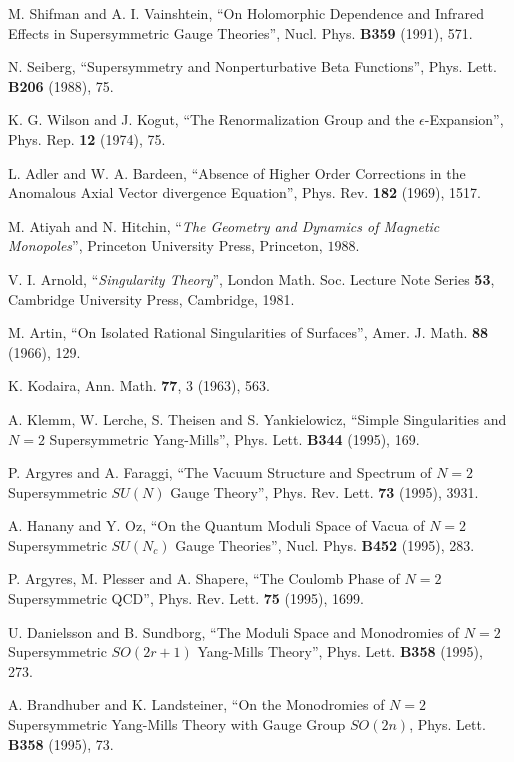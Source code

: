 \begin{thebibliography}{99}
 M. Shifman and A. I. Vainshtein, ``On Holomorphic Dependence 
and Infrared Effects in Supersymmetric Gauge
Theories'', Nucl. Phys.
{\bf B359} (1991), 571.

 N. Seiberg, ``Supersymmetry and Nonperturbative
Beta Functions'', Phys. Lett. {\bf B206} (1988), 75.

 K. G. Wilson and J. Kogut, ``The Renormalization
Group and the $\epsilon$-Expansion'', Phys. Rep. {\bf 12} (1974),
75.

 L. Adler and W. A. Bardeen, ``Absence of Higher
Order Corrections in the Anomalous Axial Vector divergence
Equation'', Phys. Rev. {\bf 182} (1969), 1517.

 M. Atiyah and N. Hitchin, ``{\em The Geometry and
Dynamics of Magnetic Monopoles}'', Princeton University Press,
Princeton, $1988$.

 V. I. Arnold, ``{\em Singularity Theory}'',
London Math. Soc. Lecture Note Series {\bf 53}, Cambridge
University Press, Cambridge, 1981.

 M. Artin, ``On Isolated Rational Singularities of
Surfaces'', Amer. J. Math. {\bf 88} (1966), 129.

 K. Kodaira, Ann. Math. {\bf 77}, 3 (1963), 563.

 A. Klemm, W. Lerche, S. Theisen and S.
Yankielowicz, ``Simple Singularities and $N=2$ Supersymmetric
Yang-Mills'', Phys. Lett. {\bf B344} (1995), 169.

 P. Argyres and A. Faraggi, ``The Vacuum Structure
and Spectrum of $N=2$ Supersymmetric $SU(N)$ Gauge Theory'',
Phys. Rev. Lett. {\bf 73} (1995), 3931.

 A. Hanany and Y. Oz, ``On the Quantum Moduli Space
of Vacua of $N=2$ Supersymmetric $SU(N_c)$ Gauge Theories'', Nucl.
Phys. {\bf B452} (1995), 283.

 P. Argyres, M. Plesser and A. Shapere, ``The
Coulomb Phase of $N=2$ Supersymmetric QCD'', Phys. Rev. Lett.
{\bf 75} (1995), 1699.

 U. Danielsson and B. Sundborg, ``The Moduli Space
and Monodromies of $N=2$ Supersymmetric $SO(2r+1)$ Yang-Mills
Theory'', Phys. Lett. {\bf B358} (1995), 273.

 A. Brandhuber and K. Landsteiner, ``On the
Monodromies of $N=2$ Supersymmetric Yang-Mills Theory with Gauge
Group $SO(2n)$, Phys. Lett. {\bf B358} (1995), 73.


\end{thebibliography}
